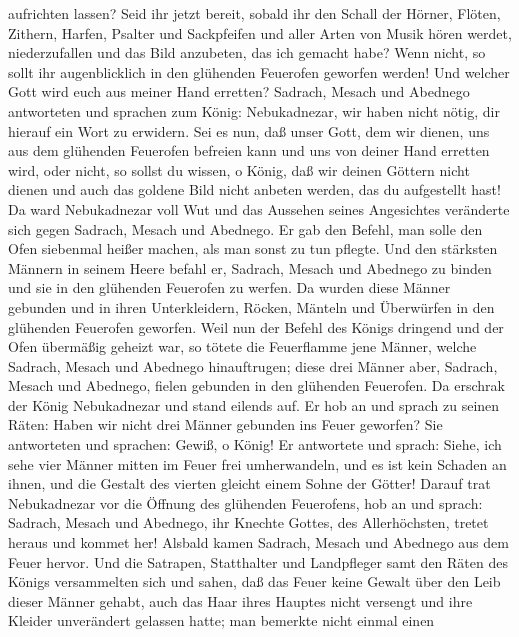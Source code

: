 aufrichten lassen?  Seid ihr jetzt bereit, sobald ihr den
Schall der Hörner, Flöten, Zithern, Harfen, Psalter und Sackpfeifen und
aller Arten von Musik hören werdet, niederzufallen und das Bild
anzubeten, das ich gemacht habe? Wenn nicht, so sollt ihr augenblicklich
in den glühenden Feuerofen geworfen werden! Und welcher Gott wird euch
aus meiner Hand erretten?  Sadrach, Mesach und Abednego
antworteten und sprachen zum König: Nebukadnezar, wir haben nicht nötig,
dir hierauf ein Wort zu erwidern.  Sei es nun, daß unser
Gott, dem wir dienen, uns aus dem glühenden Feuerofen befreien kann und
uns von deiner Hand erretten wird, oder nicht, so sollst du wissen, o
König,  daß wir deinen Göttern nicht dienen und auch das
goldene Bild nicht anbeten werden, das du aufgestellt hast!
 Da ward Nebukadnezar voll Wut und das Aussehen seines
Angesichtes veränderte sich gegen Sadrach, Mesach und Abednego. Er gab
den Befehl, man solle den Ofen siebenmal heißer machen, als man sonst zu
tun pflegte.  Und den stärksten Männern in seinem Heere
befahl er, Sadrach, Mesach und Abednego zu binden und sie in den
glühenden Feuerofen zu werfen.  Da wurden diese Männer
gebunden und in ihren Unterkleidern, Röcken, Mänteln und Überwürfen in
den glühenden Feuerofen geworfen.  Weil nun der Befehl
des Königs dringend und der Ofen übermäßig geheizt war, so tötete die
Feuerflamme jene Männer, welche Sadrach, Mesach und Abednego
hinauftrugen;  diese drei Männer aber, Sadrach, Mesach
und Abednego, fielen gebunden in den glühenden Feuerofen.
 Da erschrak der König Nebukadnezar und stand eilends
auf. Er hob an und sprach zu seinen Räten: Haben wir nicht drei Männer
gebunden ins Feuer geworfen? Sie antworteten und sprachen: Gewiß, o
König!  Er antwortete und sprach: Siehe, ich sehe vier
Männer mitten im Feuer frei umherwandeln, und es ist kein Schaden an
ihnen, und die Gestalt des vierten gleicht einem Sohne der Götter!
 Darauf trat Nebukadnezar vor die Öffnung des glühenden
Feuerofens, hob an und sprach: Sadrach, Mesach und Abednego, ihr Knechte
Gottes, des Allerhöchsten, tretet heraus und kommet her! Alsbald kamen
Sadrach, Mesach und Abednego aus dem Feuer hervor.  Und
die Satrapen, Statthalter und Landpfleger samt den Räten des Königs
versammelten sich und sahen, daß das Feuer keine Gewalt über den Leib
dieser Männer gehabt, auch das Haar ihres Hauptes nicht versengt und
ihre Kleider unverändert gelassen hatte; man bemerkte nicht einmal einen
